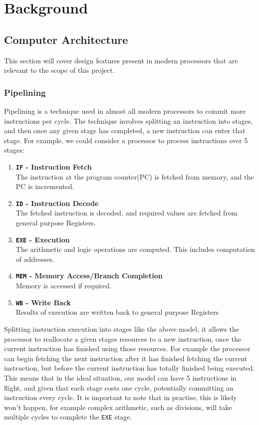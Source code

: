 \documentclass[bsc,frontabs,twoside,singlespacing,parskip,deptreport]{infthesis}     %
\begin{document}
\chapter{Background}
\section{Computer Architecture}
This section will cover design features present in modern processors that are relevant to the scope of this project.

\subsection{Pipelining}
Pipelining is a technique used in almost all modern processors to commit more instructions per cycle. The technique involves splitting an instruction into stages, and then once any given stage has completed, a new instruction can enter that stage. For example, we could consider a processor to process instructions over 5 stages:
\begin{enumerate}
    \item{{\bf \texttt{IF} - Instruction Fetch} \\ The instruction at the program counter(PC) is fetched from memory, and the PC is incremented.}
    \item{{\bf \texttt{ID} - Instruction Decode} \\ The fetched instruction is decoded, and required values are fetched from general purpose Registers.}
    \item{{\bf \texttt{EXE} - Execution} \\ The arithmetic and logic operations are computed. This includes computation of addresses. }
    \item{{\bf \texttt{MEM} - Memory Access/Branch Completion} \\ Memory is accessed if required.}
    \item{{\bf \texttt{WB} - Write Back} \\ Results of execution are written back to general purpose Registers}
\end{enumerate}
Splitting instruction execution into stages like the above model, it allows the processor to reallocate a given stages resources to a new instruction, once the current instruction has finished using those resources. For example the processor can begin fetching the next instruction after it has finished fetching the current instruction, but before the current instruction has totally finished being executed. This means that in the ideal situation, our model can have 5 instructions in flight, and given that each stage costs one cycle, potentially committing an instruction every cycle. It is important to note that in practise, this is likely won't happen, for example complex arithmetic, such as divisions, will take multiple cycles to complete the \texttt{EXE} stage.
\end{document}
